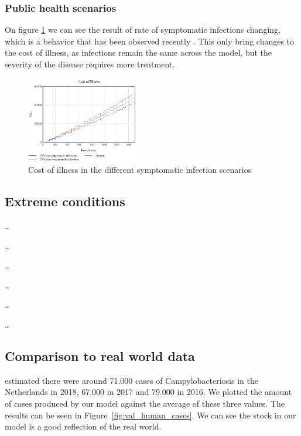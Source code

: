 \subsubsection{Public health scenarios}

On figure \ref{fig:symptom_COI} we can see the result of rate of symptomatic infections changing, which is a behavior that has been observed recently \parencite{medema_assessment_1996}. This only bring changes to the cost of illness, as infections remain the same across the model, but the severity of the disease requires more treatment.

\begin{figure}[h!]
    \centering
    \includegraphics[width=0.45\textwidth]{images/sensitivity/Symptomatic COI.png} 
    \caption{Cost of illness in the different symptomatic infection scenarios}
    \label{fig:symptom_COI}
\end{figure}

\subsection{Extreme conditions}

\ldots

\ldots

\ldots

\ldots

\ldots

\ldots


\subsection{Comparison to real world data}

\textcite{vlaanderen_staat_2019} estimated there were around 71.000 cases of Campylobacteriosis in the Netherlands in 2018, 67.000 in 2017 and 79.000 in 2016. We plotted the amount of cases produced by our model against the average of these three values. The results can be seen in Figure~\ref{fig:val_human_cases}. We can see the stock in our model is a good reflection of the real world. 


